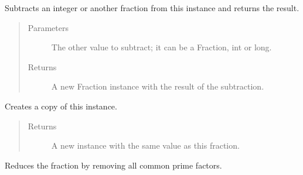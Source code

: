 \documentclass[letterpaper,10pt,english]{sphinxhowto}
\begin{document}
\begin{fulllineitems}
\begin{fulllineitems}
\begin{quote}
\begin{description}
\begin{itemize}
\end{itemize}


\end{description}\end{quote}

\end{fulllineitems}


\begin{fulllineitems}
\label{\detokenize{fraction:fraction.Fraction.__sub__}}
Subtracts an integer or another fraction from this instance and returns the result.
\begin{quote}\begin{description}
\item[{Parameters}] \leavevmode
{} \textendash{} The other value to subtract; it can be a Fraction, int or long.

\item[{Returns}] \leavevmode
A new Fraction instance with the result of the subtraction.

\end{description}\end{quote}

\end{fulllineitems}


\begin{fulllineitems}
\label{\detokenize{fraction:fraction.Fraction.clone}}
Creates a copy of this instance.
\begin{quote}\begin{description}
\item[{Returns}] \leavevmode
A new instance with the same value as this fraction.

\end{description}\end{quote}

\end{fulllineitems}


\begin{fulllineitems}
\label{\detokenize{fraction:fraction.Fraction.reduce}}
Reduces the fraction by removing all common prime factors.

\end{fulllineitems}


\end{fulllineitems}
\end{document}
